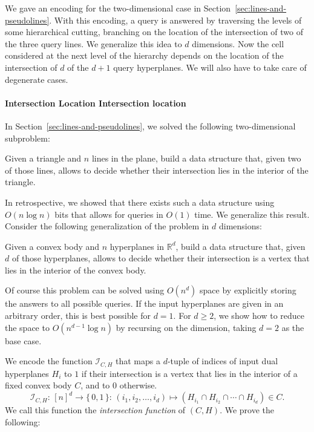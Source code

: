 We gave an encoding for the two-dimensional case in Section~\ref{sec:lines-and-pseudolines}.
With this encoding, a query is answered by traversing the levels of
some hierarchical cutting, branching on the location of the intersection of two
of the three query lines. We generalize this idea to \(d\) dimensions. Now the
cell considered at the next level of the hierarchy depends on the location
of the intersection of \(d\) of the \(d+1\) query hyperplanes.
\ifjournal%
  We will also have to take care of degenerate cases.
\fi%

\paragraph*{\iftitlecase%
Intersection Location\else%
Intersection location\fi}

In Section~\ref{sec:lines-and-pseudolines}, we solved the following two-dimensional subproblem:

\begin{problem}
  Given a triangle and \(n\) lines in the plane, build a data structure that,
  given two of those lines, allows to decide whether their intersection
  lies in the interior of the triangle.
\end{problem}

In retrospective, we showed that there exists such a data structure using
\(O(n \log n)\) bits that allows for queries in \(O(1)\) time. We generalize
this result. Consider the following generalization of the problem in
\(d\) dimensions:

\begin{problem}
  Given a convex body and \(n\) hyperplanes in \(\mathbb{R}^d\), build a data
  structure that, given \(d\) of those hyperplanes, allows to decide whether their
  intersection is a vertex that lies in the interior of the convex body.
\end{problem}

Of course this problem can be solved using \(O(n^d)\) space by explicitly
storing the answers to all possible queries. If the input hyperplanes are
given in an arbitrary order, this is best possible for
\(d=1\). For \(d \geq 2\), we show how to reduce the space to \(O(n^{d-1} \log
n)\) by recursing on the dimension, taking \(d = 2\) as the base case.

We encode the function \(\mathcal{I}_{C, H}\)
that maps a \(d\)-tuple of indices of input dual
hyperplanes \(H_i\) to \(1\) if their intersection is a vertex that lies in the
interior of a fixed convex body \(C\), and to \(0\) otherwise.
%
\begin{displaymath}
  \mathcal{I}_{C,H} \colon\, {[n]}^d \to \{\, 0,1\,\} \colon\,
  (i_1,i_2,\ldots,i_d) \mapsto
  (H_{i_1} \cap H_{i_2} \cap \cdots \cap H_{i_d})
  \in  C.
\end{displaymath}
%
We call this function the \emph{intersection function} of \((C,H)\).
%
We prove the following:


